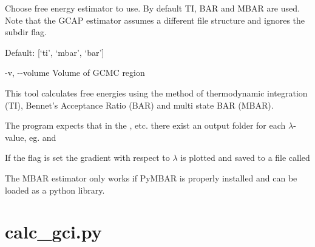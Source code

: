 \documentclass[letterpaper,10pt,english]{sphinxmanual}
\begin{document}
\begin{optionlist}{3cm}
Choose free energy estimator to use. By default TI, BAR and MBAR are used. Note that the GCAP estimator assumes a different file structure and ignores the \textendash{}subdir flag.

Default: {[}‘ti’, ‘mbar’, ‘bar’{]}
\item [-v, -{-}volume]  
Volume of GCMC region
\end{optionlist}


%
\begin{sphinxVerbatim}[commandchars=\\\{\}]
  
      
      
       
\end{sphinxVerbatim}


This tool calculates free energies using the method of thermodynamic integration (TI), Bennet’s Acceptance Ratio (BAR) and multi state BAR (MBAR).

The program expects that in the ,  etc. there exist an output folder for each \(\lambda\)-value, eg.  and 

If the  flag is set the gradient with respect to \(\lambda\) is plotted and saved to a file called 

The MBAR estimator only works if PyMBAR is properly installed and can be loaded as a python library.


\section{calc\_gci.py}
\label{\detokenize{tools:calc-gci-py}}
\end{document}
